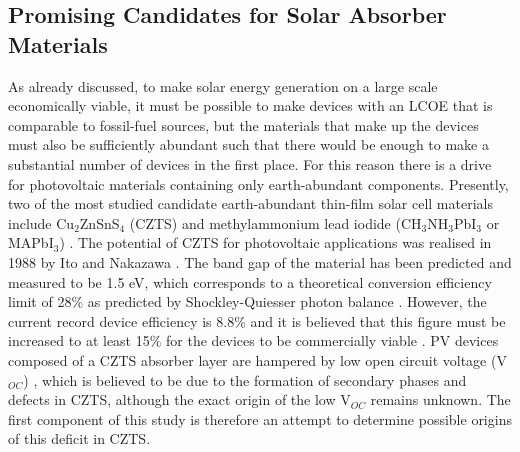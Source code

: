 \subsection{Promising Candidates for Solar Absorber Materials}
As already discussed, to make solar energy generation on a large scale economically viable, it must be possible to make devices with an LCOE that is comparable to fossil-fuel sources, but the materials that make up the devices must also be sufficiently abundant such that there would be enough to make a substantial number of devices in the first place. For this reason there is a drive for photovoltaic materials containing only earth-abundant components.
Presently, two of the most studied candidate earth-abundant thin-film solar cell materials include Cu$_2$ZnSnS$_4$ (CZTS) and methylammonium lead iodide (CH$_3$NH$_3$PbI$_3$ or MAPbI$_3$) \cite{CZTS_vs_MAPI}. The potential of CZTS for photovoltaic applications was realised in 1988 by Ito and Nakazawa \cite{first_CZTS}. The band gap of the material has been predicted \cite{CZTS_bandgap_theory} and measured \cite{CZTS_bandgap_exp} to be 1.5 eV, which corresponds to a theoretical conversion efficiency limit of 28\% as predicted by Shockley-Quiesser photon balance \cite{SQ_1961}. However, the current record device efficiency is 8.8\% \cite{CZTS_record} and it is believed that this figure must be increased to at least 15\% for the devices to be commercially viable \cite{SS}. PV devices composed of a CZTS absorber layer are hampered by low open circuit voltage (V$_{OC}$) \cite{SS}, which is believed to be due to the formation of secondary phases \cite{CZTS_phases} and defects \cite{CZTS_defects} in CZTS, although the exact origin of the low V$_{OC}$ remains unknown. The first component of this study is therefore an attempt to determine possible origins of this deficit in CZTS.\\

